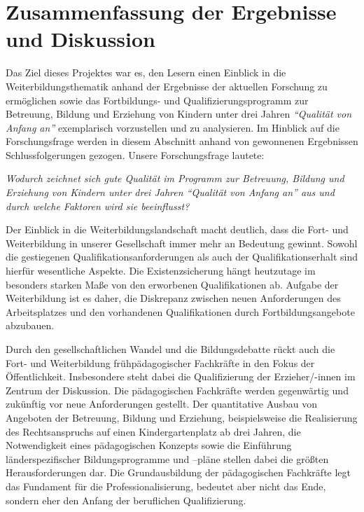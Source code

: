 \documentclass[12pt,a4paper]{article}
\begin{document}
\section{Zusammenfassung der Ergebnisse und Diskussion}

Das Ziel dieses Projektes war es, den Lesern einen Einblick in die Weiterbildungsthematik anhand der Ergebnisse der aktuellen Forschung zu er\-mög\-li\-chen sowie das Fortbildungs- und Qualifizierungsprogramm zur Betreuung, Bildung und Erziehung von Kindern unter drei Jahren \textit{"`Qualität von Anfang an"'} exemplarisch vorzustellen und zu analysieren. 
Im Hinblick auf die Forschungsfrage werden in diesem Abschnitt anhand von gewonnenen Ergebnissen Schluss\-folgerungen gezogen. Unsere Forschungsfrage lautete: 

\textit{Wodurch zeichnet sich gute Qualität im Programm zur Betreuung, Bildung und Erziehung von Kindern unter drei Jahren \textit{"`Qualität von Anfang an"'} aus und durch welche Faktoren wird sie beeinflusst?}

Der Einblick in die Weiterbildungslandschaft macht deutlich, dass die Fort- und Weiterbildung in unserer Gesellschaft immer mehr an Bedeutung gewinnt. Sowohl die gestiegenen Qualifikationsanforderungen als auch der Qualifikationserhalt sind hierfür wesentliche Aspekte. Die Existenzsicherung hängt heutzutage im besonders starken Maße von den erworbenen Qualifikationen ab. Aufgabe der Weiterbildung ist es daher, die Diskrepanz zwischen neuen Anforderungen des Arbeitsplatzes und den vorhandenen Qualifikationen durch Fortbildungsangebote abzubauen.

Durch den gesellschaftlichen Wandel und die Bildungsdebatte rückt auch die Fort- und Weiterbildung frühpädagogischer Fachkräfte in den Fokus der Öffentlichkeit. Insbesondere steht dabei die Qualifizierung der Erzieher/-innen im Zentrum der Diskussion. Die pädagogischen Fachkräfte werden gegenwärtig und zukünftig vor neue Anforderungen gestellt. Der quantitative Ausbau von Angeboten der Betreuung, Bildung und Erziehung, beispielsweise die Realisierung des Rechtsanspruchs auf einen Kindergartenplatz ab drei Jahren, die Notwendigkeit eines pädagogischen Konzepts sowie die Einführung länderspezifischer Bildungsprogramme und –pläne stellen dabei die größten Herausforderungen dar. Die Grundausbildung der pädagogischen Fachkräfte legt das Fundament für die Professionalisierung, bedeutet aber nicht das Ende, sondern eher den Anfang der beruflichen Qualifizierung. 
\end{document}

